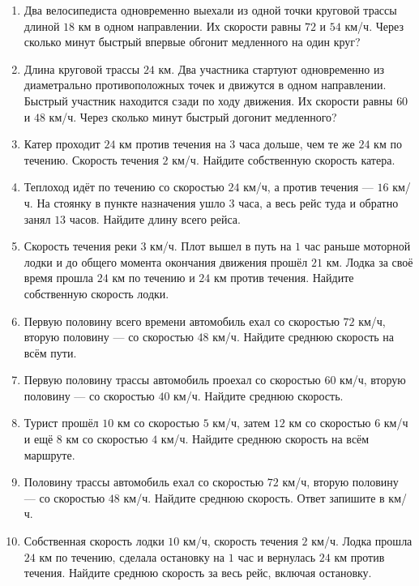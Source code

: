\documentclass[a4paper,12pt]{article}
\begin{document}
\begin{enumerate}
  \item Два велосипедиста одновременно выехали из одной точки круговой трассы длиной \(18\) км в одном направлении. Их скорости равны \(72\) и \(54\) км/ч. Через сколько минут быстрый впервые обгонит медленного на один круг?

  \item Длина круговой трассы \(24\) км. Два участника стартуют одновременно из диаметрально противоположных точек и движутся в одном направлении. Быстрый участник находится сзади по ходу движения. Их скорости равны \(60\) и \(48\) км/ч. Через сколько минут быстрый догонит медленного?

  \item Катер проходит \(24\) км против течения на \(3\) часа дольше, чем те же \(24\) км по течению. Скорость течения \(2\) км/ч. Найдите собственную скорость катера.

  \item Теплоход идёт по течению со скоростью \(24\) км/ч, а против течения — \(16\) км/ч. На стоянку в пункте назначения ушло \(3\) часа, а весь рейс туда и обратно занял \(13\) часов. Найдите длину всего рейса.

  \item Скорость течения реки \(3\) км/ч. Плот вышел в путь на \(1\) час раньше моторной лодки и до общего момента окончания движения прошёл \(21\) км. Лодка за своё время прошла \(24\) км по течению и \(24\) км против течения. Найдите собственную скорость лодки.

  \item Первую половину всего времени автомобиль ехал со скоростью \(72\) км/ч, вторую половину — со скоростью \(48\) км/ч. Найдите среднюю скорость на всём пути.

  \item Первую половину трассы автомобиль проехал со скоростью \(60\) км/ч, вторую половину — со скоростью \(40\) км/ч. Найдите среднюю скорость.

  \item Турист прошёл \(10\) км со скоростью \(5\) км/ч, затем \(12\) км со скоростью \(6\) км/ч и ещё \(8\) км со скоростью \(4\) км/ч. Найдите среднюю скорость на всём маршруте.

  \item Половину трассы автомобиль ехал со скоростью \(72\) км/ч, вторую половину — со скоростью \(48\) км/ч. Найдите среднюю скорость. Ответ запишите в км/ч.

  \item Собственная скорость лодки \(10\) км/ч, скорость течения \(2\) км/ч. Лодка прошла \(24\) км по течению, сделала остановку на \(1\) час и вернулась \(24\) км против течения. Найдите среднюю скорость за весь рейс, включая остановку.
\end{enumerate}
\end{document}
